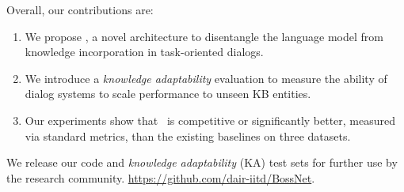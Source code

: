 Overall, our contributions are:

\begin{enumerate}
    \item We propose \sys, a novel architecture to disentangle the language model from knowledge incorporation in task-oriented dialogs.
    \item We introduce a {\em knowledge adaptability} evaluation to measure the ability of dialog systems to scale performance to unseen KB entities.
    \item Our experiments show that \sys\ is competitive or significantly better, measured via standard metrics, than the existing baselines on three datasets.
\end{enumerate}

We release our code and {\em knowledge adaptability} (KA) test sets for further use by the research community. \url{ https://github.com/dair-iitd/BossNet}.

